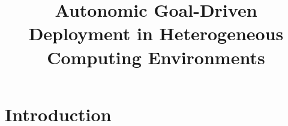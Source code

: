 \documentclass[mestrado]{pacotes/unb-cic}
\title{Autonomic Goal-Driven Deployment in Heterogeneous Computing Environments}
\begin{document}
\maketitle

\pretextual



\begin{abstract}%

  




\end{abstract}

\tableofcontents
\listoffigures

\textual

\chapter{Introduction}

\end{document}
